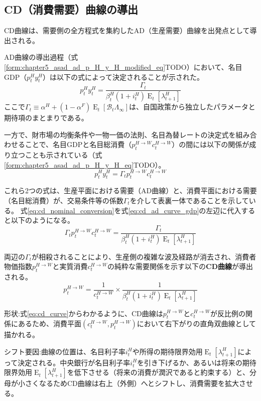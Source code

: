 
\subsection{CD（消費需要）曲線の導出}
\label{sec:chapter5_asad_cd}
CD曲線は、需要側の全方程式を集約したAD（生産需要）曲線を出発点として導出される。

AD曲線の導出過程（式\eqref{form:chapter5_asad_ad_p_H_y_H_modified_eq}TODO）において、名目GDP（\(p_t^Hy_t^H\)）は以下の式によって決定されることが示された。
\begin{equation}
\label{eq:cd_ad_curve_gdp}
    p_t^Hy_t^H=\frac{\Gamma_t}{\beta_t^H(1+i_t^H)\operatorname{E}_t[\lambda_{t+1}^H]}
\end{equation}
ここで\(\Gamma_t\equiv\alpha^H+(1-\alpha^F)\operatorname{E}_t[\mathcal{B}_t\Lambda_{\infty}]\)は、自国政策から独立したパラメータと期待項のまとまりである。

一方で、財市場の均衡条件や一物一価の法則、名目為替レートの決定式を組み合わせることで、名目GDPと名目総消費（\(p_t^{H\to W}c_t^{H\to W}\)）の間には以下の関係が成り立つことも示されている（式\eqref{form:chapter5_asad_ad_p_H_y_H_eq}TODO）。
\begin{equation}
\label{eq:cd_nominal_conversion}
    p_t^Hy_t^H=\Gamma_tp_t^{H\to W}c_t^{H\to W}
\end{equation}

これら2つの式は、生産平面における需要（AD曲線）と、消費平面における需要（名目総消費）が、交易条件等の係数\(\Gamma_t\)を介して表裏一体であることを示している。
式\eqref{eq:cd_nominal_conversion}を式\eqref{eq:cd_ad_curve_gdp}の左辺に代入すると以下のようになる。
\begin{equation}
\label{eq:cd_substitution}
    \Gamma_tp_t^{H\to W}c_t^{H\to W}=\frac{\Gamma_t}{\beta_t^H(1+i_t^H)\operatorname{E}_t[\lambda_{t+1}^H]}
\end{equation}

両辺の\(\Gamma_t\)が相殺されることにより、生産側の複雑な波及経路が消去され、消費者物価指数\(p_t^{H\to W}\)と実質消費\(c_t^{H\to W}\)の純粋な需要関係を示す以下の\textbf{CD曲線}が導出される。
\begin{equation}
\label{eq:cd_curve}
    p_t^{H\to W}=\frac{1}{c_t^{H\to W}}\times\frac{1}{\beta_t^H(1+i_t^H)\operatorname{E}_t[\lambda_{t+1}^H]}
\end{equation}

形状:式\eqref{eq:cd_curve}からわかるように、CD曲線は\(p_t^{H\to W}\)と\(c_t^{H\to W}\)が反比例の関係にあるため、消費平面\((c_t^{H\to W},p_t^{H\to W})\)において右下がりの直角双曲線として描かれる。

シフト要因:曲線の位置は、名目利子率\(i_t^H\)や所得の期待限界効用\(\operatorname{E}_t[\lambda_{t+1}^H]\)によって決定される。中央銀行が名目利子率\(i_t^H\)を引き下げるか、あるいは将来の期待限界効用\(\operatorname{E}_t[\lambda_{t+1}^H]\)を低下させる（将来の消費が潤沢であると約束する）と、分母が小さくなるためCD曲線は右上（外側）へとシフトし、消費需要を拡大させる。
